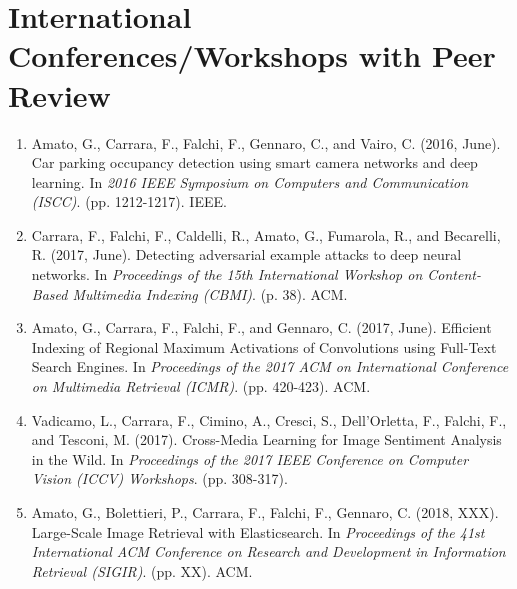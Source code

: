 \section*{International Conferences/Workshops with Peer Review}
\begin{enumerate}
    \item Amato, G., Carrara, F., Falchi, F., Gennaro, C., and Vairo, C. (2016, June). Car parking occupancy detection using smart camera networks and deep learning. In \emph{2016 IEEE Symposium on Computers and Communication (ISCC)}. (pp. 1212-1217). IEEE.
    \item Carrara, F., Falchi, F., Caldelli, R., Amato, G., Fumarola, R., and Becarelli, R. (2017, June). Detecting adversarial example attacks to deep neural networks. In \emph{Proceedings of the 15th International Workshop on Content-Based Multimedia Indexing (CBMI)}. (p. 38). ACM.
    \item Amato, G., Carrara, F., Falchi, F., and Gennaro, C. (2017, June). Efficient Indexing of Regional Maximum Activations of Convolutions using Full-Text Search Engines. In \emph{Proceedings of the 2017 ACM on International Conference on Multimedia Retrieval (ICMR)}. (pp. 420-423). ACM.
    \item Vadicamo, L., Carrara, F., Cimino, A., Cresci, S., Dell’Orletta, F., Falchi, F., and Tesconi, M. (2017). Cross-Media Learning for Image Sentiment Analysis in the Wild. In \emph{Proceedings of the 2017 IEEE Conference on Computer Vision (ICCV) Workshops}. (pp. 308-317).
    \item Amato, G., Bolettieri, P., Carrara, F., Falchi, F., Gennaro, C. (2018, XXX). Large-Scale Image Retrieval with Elasticsearch. In \emph{Proceedings of the 41st International ACM Conference on Research and Development in Information Retrieval (SIGIR)}. (pp. XX). ACM.
\end{enumerate}

